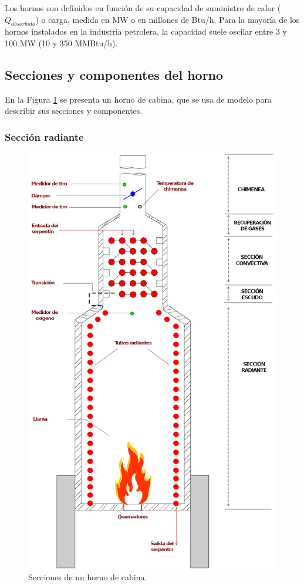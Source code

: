 \par Los hornos son definidos en función de su capacidad de suministro de calor ($Q_{absorbido}$) o carga, medida en MW o en millones de Btu/h. Para la mayoría de los hornos instalados en la industria petrolera, la capacidad suele oscilar entre 3 y 100 MW (10 y 350 MMBtu/h)\cite{bib:sandoval}.

\subsection{Secciones y componentes del horno}
\par En la Figura \ref{fig:horno} se presenta un horno de cabina, que se usa de modelo para describir sus secciones y componentes.
\subsubsection{Sección radiante}
\begin{figure} \begin{center}
\includegraphics[scale=0.38]{images/horno}
\caption[Secciones de un horno]{Secciones de un horno de cabina.\cite{bib:thermox}}
\label{fig:horno} \end{center} \end{figure}

